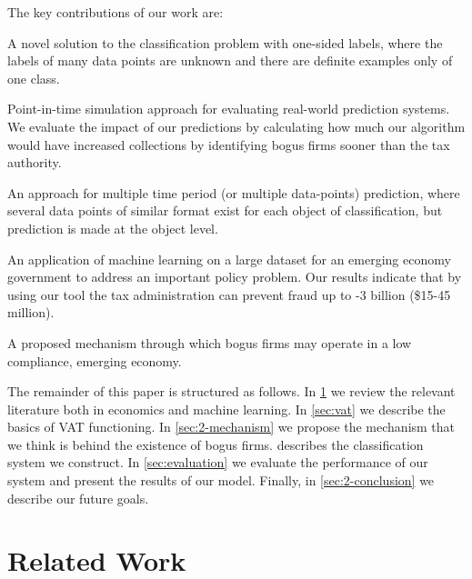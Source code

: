 The key contributions of our work are:
\begin{compactitem}
\item A novel solution to the classification problem with one-sided  labels, where the labels of many data points are unknown and there  are definite examples only of one class.
\item Point-in-time simulation approach for evaluating real-world prediction systems. We evaluate the impact of our predictions by
  calculating how much our algorithm would have increased collections by identifying bogus firms sooner than the tax authority.
\item An approach for multiple time period (or multiple data-points) prediction, where several data points of similar format exist for each object of classification, but prediction is made at the object  level.
\item An application of machine learning on a large dataset for an emerging economy government to address an important policy problem. Our results indicate that by using our tool the tax administration can prevent fraud up to -3 billion (\$15-45 million).
\item A proposed mechanism through which bogus firms may operate in a low compliance, emerging economy.
\end{compactitem}

The remainder of this paper is structured as follows. In \cref{sec:literature} we review the relevant literature both in economics and machine learning. In \cref{sec:vat} we describe the basics of VAT functioning. In \cref{sec:2-mechanism} we propose the mechanism that we think is behind the existence of bogus firms.  describes the classification system we construct. In \cref{sec:evaluation} we evaluate the performance of our system and present the results of our model. Finally, in \cref{sec:2-conclusion} we describe our future goals.


\section{Related Work}
\label{sec:literature}
